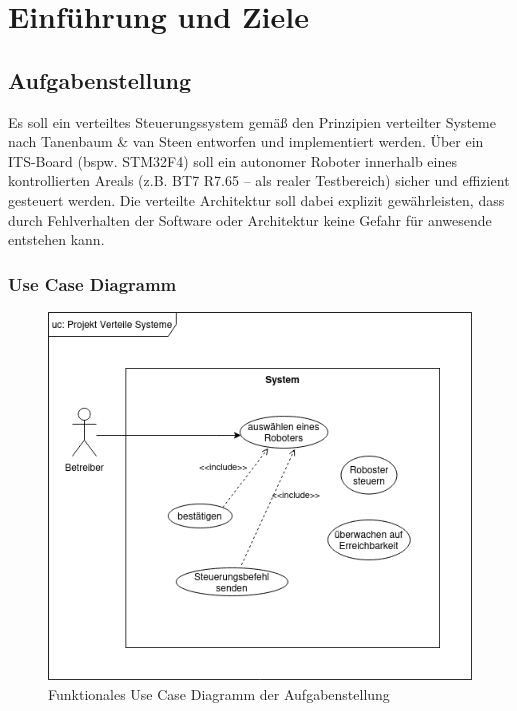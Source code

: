 \chapter{Einführung und Ziele}

\section{Aufgabenstellung}

Es soll ein verteiltes Steuerungssystem gemäß den Prinzipien verteilter Systeme nach Tanenbaum \& van Steen entworfen und implementiert werden. Über ein ITS-Board (bspw. STM32F4) soll ein autonomer Roboter innerhalb eines kontrollierten Areals (z.B. BT7 R7.65 – als realer Testbereich) sicher und effizient gesteuert werden. Die verteilte Architektur soll dabei explizit gewährleisten, dass durch Fehlverhalten der Software oder Architektur keine Gefahr für anwesende entstehen kann.


\subsection*{Use Case Diagramm} %

\begin{figure}[h]
	\centering
	\includegraphics[scale=.5]{diagrams/use_case.png}
	\caption{Funktionales Use Case Diagramm der Aufgabenstellung}
	\label{fig:meine-grafik}
\end{figure}


